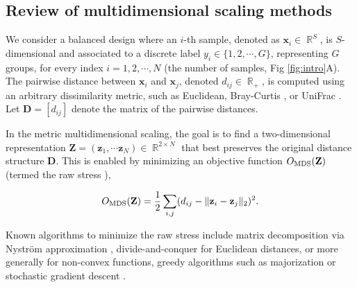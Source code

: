 \documentclass[10pt,letterpaper]{article}
\DeclareMathOperator*{\bbr}{\mathbb{R}}
\newcommand{\1}{{\rm 1}\kern-0.24em{\rm I}}
\begin{document}
\subsection*{Review of multidimensional scaling methods}
We consider a balanced design where an $i$-th sample, denoted as $\mathbf{x}_i \in \bbr^{S}$, is $S$-dimensional and associated to a discrete label $y_i \in \{1,2, \cdots,G \}$, representing $G$ groups, for every index $i=1,2,\cdots, N$ (the number of samples, Fig \ref{fig:intro}A). 
The pairwise distance between $\mathbf{x}_i$ and $\mathbf{x}_j$, denoted $d_{ij}\in \bbr_{+}$, is computed using an arbitrary dissimilarity metric, such as Euclidean, Bray-Curtis \cite{Bray57}, or UniFrac \cite{lozupone05}. 
Let $\mathbf{D} = [d_{ij}]$ denote the matrix of the pairwise distances.

In the metric multidimensional scaling, the goal is to find a two-dimensional representation $\mathbf{Z} = (\mathbf{z}_1, \cdots \mathbf{z}_N)\in \bbr^{2 \times N}$ that best preserves the original distance structure $\mathbf{D}$. 
This is enabled by minimizing an objective function $O_{\rm MDS}(\mathbf{Z})$ (termed the raw stress \cite{borg05c}),

\begin{equation}
    O_{\rm MDS}(\mathbf{Z})  = \frac{1}{2}\sum_{i,j} (d_{ij} - \| \mathbf{z}_i - \mathbf{z}_j \|_2 )^2.
\end{equation}

Known algorithms to minimize the raw stress include matrix decomposition via Nyström approximation \cite{Platt05}, divide-and-conquer \cite{Yang06, Qu15} for Euclidean distances, or more generally for non-convex functions, greedy algorithms \cite{Demaine21} such as majorization \cite{deLeeuw88, borg97a} or stochastic gradient descent \cite{Kruskal64, zheng19, Fang25}.
\end{document}
